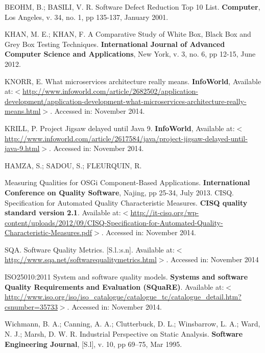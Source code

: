 \documentclass[cic,tc,english]{iiufrgs} %
\begin{document}
\begin{thebibliography}{este-parametro-nao-eh-usado-pelo-estilo-ABNT}

 BEOHM, B.; BASILI, V. R.
Software Defect Reduction Top 10 List. \textbf{Computer}, Los Angeles, v. 34, no. 1, pp 135-137, January 2001.

 KHAN, M. E.; KHAN, F.
A Comparative Study of White Box, Black Box and Grey Box Testing Techniques. \textbf{International Journal of Advanced Computer Science and Applications}, New York, v. 3, no. 6, pp 12-15, June 2012.

 KNORR, E.
What microservices architecture really means. \textbf{InfoWorld}, Available at:$<$\url{http://www.infoworld.com/article/2682502/application-development/application-development-what-microservices-architecture-really-means.html}$>$. Accessed in: November 2014.

 KRILL, P.
Project Jigsaw delayed until Java 9. \textbf{InfoWorld}, Available at:$<$\url{http://www.infoworld.com/article/2617584/java/project-jigsaw-delayed-until-java-9.html}$>$. Accessed in: November 2014.

 HAMZA, S.; SADOU, S.; FLEURQUIN, R.

Measuring Qualities for OSGi Component-Based Applications. \textbf{International Conference on Quality Software}, Najing, pp 25-34, July 2013.
 CISQ.
Specification for Automated Quality Characteristic Measures. \textbf{CISQ quality standard version 2.1}. Available at:$<$\url{http://it-cisq.org/wp-content/uploads/2012/09/CISQ-Specification-for-Automated-Quality-Characteristic-Measures.pdf}$>$. Accessed in: November 2014.

 SQA.
Software Quality Metrics. [S.l.:s.n]. Available at:$<$\url{http://www.sqa.net/softwarequalitymetrics.html}$>$. Accessed in: November 2014

 ISO25010:2011
System and software quality models. \textbf{Systems and software Quality Requirements and Evaluation (SQuaRE)}. Available at:$<$\url{http://www.iso.org/iso/iso_catalogue/catalogue_tc/catalogue_detail.htm?csnumber=35733}$>$. Accessed in: November 2014.

Wichmann, B. A.; Canning, A. A.; Clutterbuck, D. L.; Winsbarrow, L. A.; Ward, N. J.; Marsh, D. W. R.
Industrial Perspective on Static Analysis. \textbf{Software Engineering Journal}, [S.l], v. 10, pp 69–75, Mar 1995.


\end{thebibliography}
\end{document}
